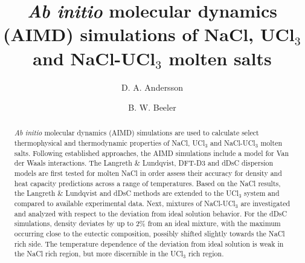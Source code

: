 \documentclass[preprint,3p,10pt,onecolumn,number,sort&compress]{elsarticle}
\begin{document}
\begin{frontmatter}


\title{\textit{Ab initio} molecular dynamics (AIMD) simulations of NaCl, UCl$_3$ and NaCl-UCl$_3$ molten salts}

\author[label1]{D. A. Andersson}
\author[label2,label3]{B. W. Beeler}
\address[label1]{Los Alamos National Laboratory}
\address[label2]{North Carolina State University}
\address[label3]{Idaho National Laboratory}


\begin{abstract}
\textit{Ab initio} molecular dynamics (AIMD) simulations are used to calculate select thermophysical %
and thermodynamic %
properties of NaCl, UCl$_3$ and NaCl-UCl$_3$ molten salts. Following established approaches, the AIMD simulations %
include a model for Van der Waals interactions. The Langreth \& Lundqvist, DFT-D3 and dDsC dispersion models are first tested for molten NaCl in order assess their accuracy for density and heat capacity predictions across a range of temperatures. %
Based on the NaCl results, the Langreth \& Lundqvist and dDsC methods are extended to the UCl$_3$ system and compared to available experimental data. %
Next, mixtures of NaCl-UCl$_3$ are investigated and analyzed with respect to the deviation from ideal solution behavior. %
For the dDsC simulations, density deviates by up to 2\% from an ideal mixture, with the maximum occurring close to the eutectic composition, %
possibly shifted slightly towards the NaCl rich side. The temperature dependence of the deviation from ideal solution is weak in the NaCl rich region, but more discernible in the UCl$_3$ rich region. %

\end{abstract}
\end{frontmatter}
\end{document}
